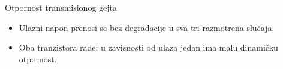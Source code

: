 \begin{frame}[label=09_3-s064]{Otpornost transmisionog gejta}
\begin{itemize}
\item Ulazni napon prenosi se bez degradacije u sva tri razmotrena slučaja.
\item Oba tranzistora rade; u zavisnosti od ulaza jedan ima malu dinamičku otpornost.
\end{itemize}\begin{center}

\end{center}
\end{frame}
